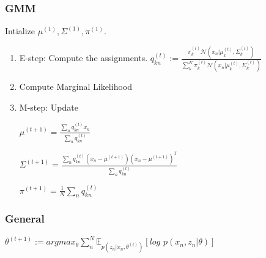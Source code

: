 \subsubsection{GMM}
Intialize $\mu^{(1)}, \Sigma^{(1)}, \pi^{(1)}$.
\begin{enumerate}
\item E-step: Compute the assignments. $q_{kn}^{(t)} := \frac{\pi_k^{(t)} \mathcal{N}(x_n|\mu_k^{(t)}, \Sigma_k^{(t)})}{ \sum_k^K \pi_k^{(t)} \mathcal{N}(x_n|\mu_k^{(t)}, \Sigma_k^{(t)}) }$
\item Compute Marginal Likelihood
\item M-step: Update 

$\mu^{(t+1)} = \frac{\sum_n q_{kn}^{(t)} x_n}{\sum_n q_{kn}^{(t)}}$

$\Sigma^{(t+1)} = \frac{\sum_n q_{kn}^{(t)}(x_n - \mu^{(t+1)})(x_n - \mu^{(t+1)})^T}{\sum_n q_{kn}^{(t)}}$

$\pi^{(t+1)} = \frac{1}{N} \sum_n q_{kn}^{(t)}$
\end{enumerate}

\subsubsection{General}
$\theta^{(t+1)} := argmax_{\theta} \sum_n^N \mathbb{E}_{p(z_n|x_n,\theta^{(t)})}[log\,\, p(x_n,z_n|\theta)]$

